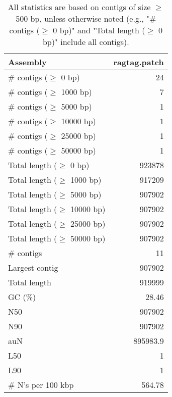 \documentclass[12pt,a4paper]{article}
\begin{document}
\begin{table}[ht]
\begin{center}
\caption{All statistics are based on contigs of size $\geq$ 500 bp, unless otherwise noted (e.g., "\# contigs ($\geq$ 0 bp)" and "Total length ($\geq$ 0 bp)" include all contigs).}
\begin{tabular}{|l*{1}{|r}|}
\hline
Assembly & ragtag.patch \\ \hline
\# contigs ($\geq$ 0 bp) & 24 \\ \hline
\# contigs ($\geq$ 1000 bp) & 7 \\ \hline
\# contigs ($\geq$ 5000 bp) & 1 \\ \hline
\# contigs ($\geq$ 10000 bp) & 1 \\ \hline
\# contigs ($\geq$ 25000 bp) & 1 \\ \hline
\# contigs ($\geq$ 50000 bp) & 1 \\ \hline
Total length ($\geq$ 0 bp) & 923878 \\ \hline
Total length ($\geq$ 1000 bp) & 917209 \\ \hline
Total length ($\geq$ 5000 bp) & 907902 \\ \hline
Total length ($\geq$ 10000 bp) & 907902 \\ \hline
Total length ($\geq$ 25000 bp) & 907902 \\ \hline
Total length ($\geq$ 50000 bp) & 907902 \\ \hline
\# contigs & 11 \\ \hline
Largest contig & 907902 \\ \hline
Total length & 919999 \\ \hline
GC (\%) & 28.46 \\ \hline
N50 & 907902 \\ \hline
N90 & 907902 \\ \hline
auN & 895983.9 \\ \hline
L50 & 1 \\ \hline
L90 & 1 \\ \hline
\# N's per 100 kbp & 564.78 \\ \hline
\end{tabular}
\end{center}
\end{table}
\end{document}
